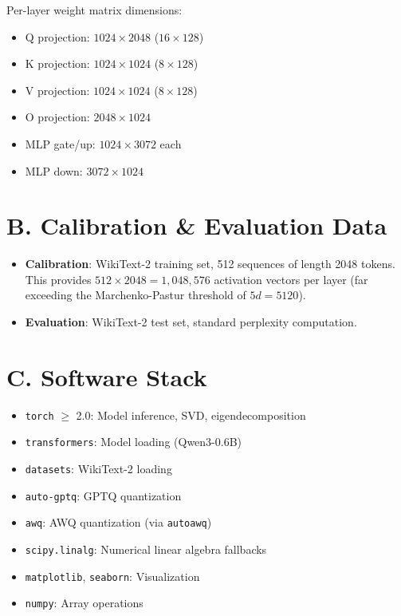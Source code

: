 \documentclass[11pt,a4paper]{article}
\begin{document}
Per-layer weight matrix dimensions:
\begin{itemize}
    \item Q projection: $1024 \times 2048$ ($16 \times 128$)
    \item K projection: $1024 \times 1024$ ($8 \times 128$)
    \item V projection: $1024 \times 1024$ ($8 \times 128$)
    \item O projection: $2048 \times 1024$
    \item MLP gate/up: $1024 \times 3072$ each
    \item MLP down: $3072 \times 1024$
\end{itemize}

\section*{B. Calibration \& Evaluation Data}

\begin{itemize}
    \item \textbf{Calibration}: WikiText-2 training set, 512 sequences of length 2048 tokens. This provides $512 \times 2048 = 1{,}048{,}576$ activation vectors per layer (far exceeding the Marchenko-Pastur threshold of $5d = 5120$).
    \item \textbf{Evaluation}: WikiText-2 test set, standard perplexity computation.
\end{itemize}

\section*{C. Software Stack}

\begin{itemize}
    \item \texttt{torch} $\geq$ 2.0: Model inference, SVD, eigendecomposition
    \item \texttt{transformers}: Model loading (Qwen3-0.6B)
    \item \texttt{datasets}: WikiText-2 loading
    \item \texttt{auto-gptq}: GPTQ quantization
    \item \texttt{awq}: AWQ quantization (via \texttt{autoawq})
    \item \texttt{scipy.linalg}: Numerical linear algebra fallbacks
    \item \texttt{matplotlib}, \texttt{seaborn}: Visualization
    \item \texttt{numpy}: Array operations
\end{itemize}
\end{document}
